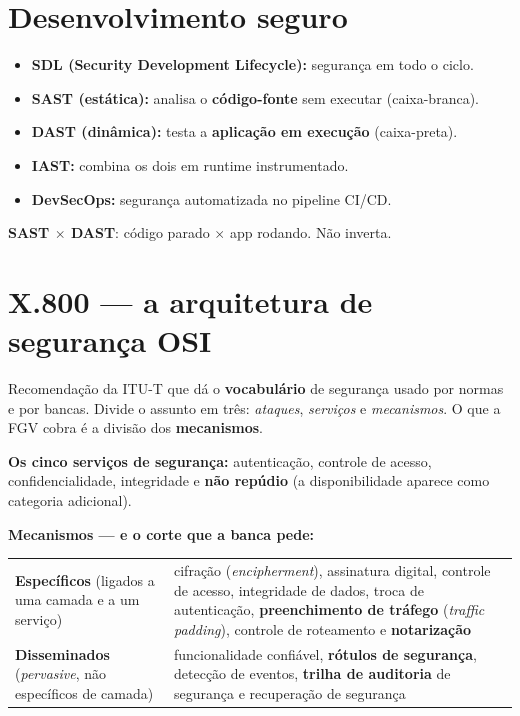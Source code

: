 \section{Desenvolvimento seguro}

\begin{itemize}
\item \textbf{SDL (Security Development Lifecycle):} segurança em todo o
ciclo.
\item \textbf{SAST (estática):} analisa o \textbf{código-fonte} sem
executar (caixa-branca).
\item \textbf{DAST (dinâmica):} testa a \textbf{aplicação em execução}
(caixa-preta).
\item \textbf{IAST:} combina os dois em runtime instrumentado.
\item \textbf{DevSecOps:} segurança automatizada no pipeline CI/CD.
\end{itemize}

\begin{pegadinha}
\textbf{SAST $\times$ DAST}: código parado $\times$ app rodando. Não
inverta.
\end{pegadinha}

\section{X.800 --- a arquitetura de segurança OSI}

Recomendação da ITU-T que dá o \textbf{vocabulário} de segurança usado por
normas e por bancas. Divide o assunto em três: \emph{ataques}, \emph{serviços}
e \emph{mecanismos}. O que a FGV cobra é a divisão dos \textbf{mecanismos}.

\textbf{Os cinco serviços de segurança:} autenticação, controle de acesso,
confidencialidade, integridade e \textbf{não repúdio} (a disponibilidade
aparece como categoria adicional).

\textbf{Mecanismos --- e o corte que a banca pede:}

\begin{center}
\begin{tabular}{@{}p{3.4cm}p{8.6cm}@{}}
\toprule
\textbf{Específicos} \newline (ligados a uma camada e a um serviço) & cifração (\emph{encipherment}), assinatura digital, controle de acesso, integridade de dados, troca de autenticação, \textbf{preenchimento de tráfego} (\emph{traffic padding}), controle de roteamento e \textbf{notarização} \\
\addlinespace
\textbf{Disseminados} \newline (\emph{pervasive}, não específicos de camada) & funcionalidade confiável, \textbf{rótulos de segurança}, detecção de eventos, \textbf{trilha de auditoria} de segurança e recuperação de segurança \\
\bottomrule
\end{tabular}
\end{center}


